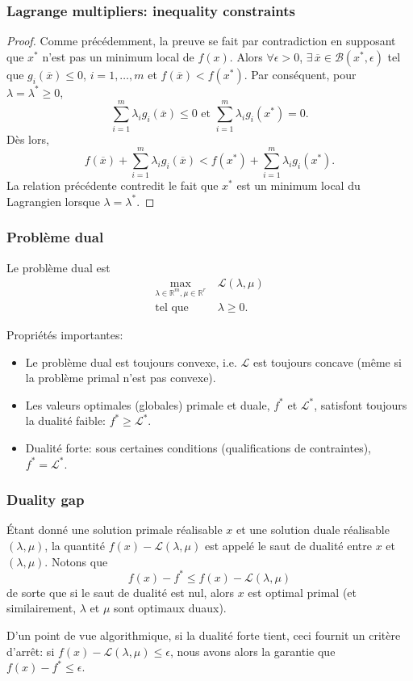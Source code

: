 \documentclass[usepdftitle=false]{beamer}
\def\blue{\color{blue}}
\def\cB{\mathcal{B}}
\def\cL{\mathcal{L}}
\def\RR{\mathbb{R}}
\begin{document}
\begin{frame}
\frametitle{Lagrange multipliers: inequality constraints}
	
\begin{proof}
Comme précédemment, la preuve se fait par contradiction en supposant que $x^*$ n'est pas un minimum local de $f(x)$.
Alors $\forall \epsilon > 0$, $\exists\, \overline{x} \in \cB(x^*, \epsilon)$ tel que $g_i(\overline{x}) \leq 0$, $i = 1,\ldots,m$ et $f(\overline{x}) < f(x^*)$.
Par conséquent, pour $\lambda = \lambda^* \geq 0$,
$$
\sum_{i = 1}^{m} \lambda_i g_i(\overline{x}) \leq 0 \mbox{ et }
\sum_{i = 1}^{m} \lambda_i g_i(x^*) = 0.
$$
Dès lors,
$$
f(\overline{x}) + \sum_{i = 1}^{m} \lambda_i g_i(\overline{x}) < f(x^*) + \sum_{i = 1}^{m} \lambda_i g_i(x^*).
$$
La relation précédente contredit le fait que $x^*$ est un
minimum local du Lagrangien lorsque $\lambda = \lambda^*$.
\end{proof}

\end{frame}

\begin{frame}
\frametitle{Problème dual}

Le problème dual est
\begin{align*}
\max_{\lambda \in \RR^m, \mu \in \RR^r}\ & \cL(\lambda, \mu) \\
\mbox{tel que } & \lambda \geq 0.
\end{align*}

Propriétés importantes:
\begin{itemize}
\item
Le problème dual est toujours convexe, i.e. $\cL$ est toujours concave (même si la problème primal n'est pas convexe).
\item
Les valeurs optimales (globales) primale et duale, $f^*$ et $\cL^*$, satisfont toujours la dualité faible: $f^* \geq \cL^*$.
\item {\blue Dualité forte}: sous certaines conditions (qualifications de contraintes), $f^* = \cL^*$.
\end{itemize}

\end{frame}

\begin{frame}
\frametitle{Duality gap}

Étant donné une solution primale réalisable $x$ et une solution duale réalisable $(\lambda, \mu)$, la quantité $f(x) - \cL(\lambda, \mu)$ est appelé le saut de dualité entre $x$ et $(\lambda, \mu)$.
Notons que
$$
f(x) - f^* \leq f(x) - \cL(\lambda, \mu)
$$
de sorte que si le saut de dualité est nul, alors $x$ est optimal primal (et similairement, $\lambda$ et $\mu$ sont optimaux duaux).

\mbox{}

D'un point de vue algorithmique, si la dualité forte tient, ceci fournit un critère d'arrêt: si $f(x) - \cL(\lambda, \mu) \leq \epsilon$, nous avons alors la garantie que $f(x) - f^* \leq \epsilon$.

\end{frame}
\end{document}
